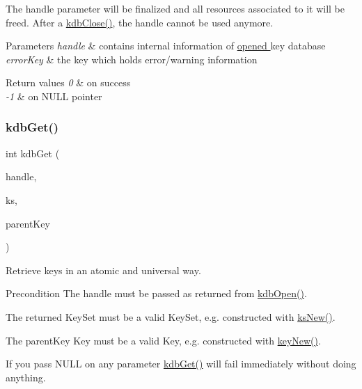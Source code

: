 The {\ttfamily handle} parameter will be finalized and all resources associated to it will be freed. After a \hyperlink{group__kdb_gadb54dc9fda17ee07deb9444df745c96f}{kdb\+Close()}, the {\ttfamily handle} cannot be used anymore.


\begin{DoxyParams}{Parameters}
{\em handle} & contains internal information of \hyperlink{group__kdb_ga844e1299a84c3fbf1d3a905c5c893ba5}{opened } key database \\
\hline
{\em error\+Key} & the key which holds error/warning information \\
\hline
\end{DoxyParams}

\begin{DoxyRetVals}{Return values}
{\em 0} & on success \\
\hline
{\em -\/1} & on N\+U\+LL pointer \\
\hline
\end{DoxyRetVals}
\mbox{\label{group__kdb_ga28e385fd9cb7ccfe0b2f1ed2f62453a1}} 
\subsubsection{\texorpdfstring{kdb\+Get()}{kdbGet()}}
{\footnotesize\ttfamily int kdb\+Get (\begin{DoxyParamCaption}\item[{K\+DB $\ast$}]{handle,  }\item[{Key\+Set $\ast$}]{ks,  }\item[{Key $\ast$}]{parent\+Key }\end{DoxyParamCaption})}



Retrieve keys in an atomic and universal way. 

\begin{DoxyPrecond}{Precondition}
The {\ttfamily handle} must be passed as returned from \hyperlink{group__kdb_ga844e1299a84c3fbf1d3a905c5c893ba5}{kdb\+Open()}.

The {\ttfamily returned} Key\+Set must be a valid Key\+Set, e.\+g. constructed with \hyperlink{group__keyset_ga671e1aaee3ae9dc13b4834a4ddbd2c3c}{ks\+New()}.

The {\ttfamily parent\+Key} Key must be a valid Key, e.\+g. constructed with \hyperlink{group__key_gad23c65b44bf48d773759e1f9a4d43b89}{key\+New()}.
\end{DoxyPrecond}
If you pass N\+U\+LL on any parameter \hyperlink{group__kdb_ga28e385fd9cb7ccfe0b2f1ed2f62453a1}{kdb\+Get()} will fail immediately without doing anything.

